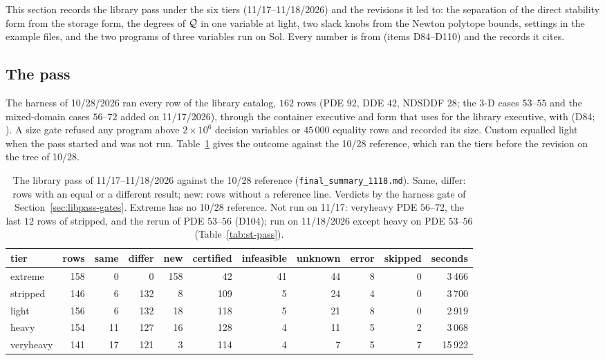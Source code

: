 This section records the library pass under the six tiers (11/17--11/18/2026) and the revisions it led to: the separation of the direct stability form from the storage form, the degrees of $\mathcal{Q}$ in one variable at light, two slack knobs from the Newton polytope bounds, settings in the example files, and the two programs of three variables run on Sol. Every number is from  (items D84--D110) and the records it cites.

\subsection{The pass}\label{sec:libpass-pass}

The harness of 10/28/2026 ran every row of the library catalog, $162$ rows (PDE $92$, DDE $42$, NDSDDF $28$; the 3-D cases $53$--$55$ and the mixed-domain cases $56$--$72$ added on 11/17/2026), through the container executive and form that  uses for the library executive, with  (D84; ). A size gate refused any program above $2\times10^6$ decision variables or $45\,000$ equality rows and recorded its size. Custom equalled light when the pass started and was not run. Table~\ref{tab:libpass} gives the outcome against the 10/28 reference, which ran the tiers before the revision on the tree of 10/28.

\begin{table}[h]\centering\footnotesize
\setlength{\tabcolsep}{4pt}
\begin{tabular}{lrrrrrrrrrr}
\toprule
tier & rows & same & differ & new & certified & infeasible & unknown & error & skipped & seconds \\
\midrule
extreme & 158 & 0 & 0 & 158 & 42 & 41 & 44 & 8 & 0 & 3\,466 \\
stripped & 146 & 6 & 132 & 8 & 109 & 5 & 24 & 4 & 0 & 3\,700 \\
light & 156 & 6 & 132 & 18 & 118 & 5 & 21 & 8 & 0 & 2\,919 \\
heavy & 154 & 11 & 127 & 16 & 128 & 4 & 11 & 5 & 2 & 3\,068 \\
veryheavy & 141 & 17 & 121 & 3 & 114 & 4 & 7 & 5 & 7 & 15\,922 \\
\bottomrule
\end{tabular}
\caption{The library pass of 11/17--11/18/2026 against the 10/28 reference (\texttt{final\_summary\_1118.md}). Same, differ: rows with an equal or a different result; new: rows without a reference line. Verdicts by the harness gate of Section~\ref{sec:libpass-gates}. Extreme has no 10/28 reference. Not run on 11/17: veryheavy PDE $56$--$72$, the last $12$ rows of stripped, and the rerun of PDE $53$--$56$ (D104); run on 11/18/2026 except heavy on PDE $53$--$56$ (Table~\ref{tab:st-pass}).}\label{tab:libpass}
\end{table}

